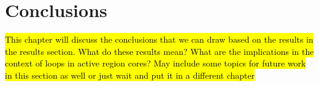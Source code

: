 \chapter{Conclusions}
\label{ch:conclusions}
\hl{This chapter will discuss the conclusions that we can draw based on the results in the results section. What do these results mean? What are the implications in the context of loops in active region cores?
May include some topics for future work in this section as well or just wait and put it in a different chapter}